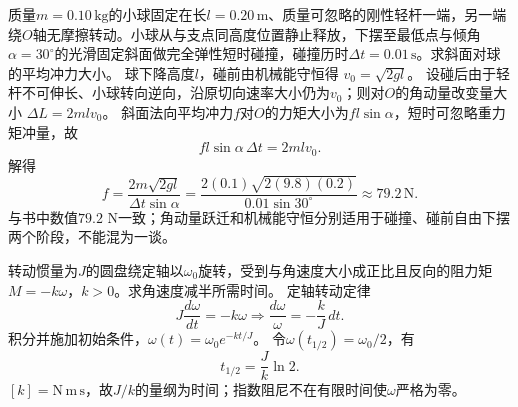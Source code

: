 \problemtext 质量$m=0.10\,\mathrm{kg}$的小球固定在长$l=0.20\,\mathrm m$、质量可忽略的刚性轻杆一端，另一端绕$O$轴无摩擦转动。小球从与支点同高度位置静止释放，下摆至最低点与倾角$\alpha=30^\circ$的光滑固定斜面做完全弹性短时碰撞，碰撞历时$\Delta t=0.01\,\mathrm s$。求斜面对球的平均冲力大小。
\workings
球下降高度$l$，碰前由机械能守恒得
$v_0=\sqrt{2gl}$。
设碰后由于轻杆不可伸长、小球转向逆向，沿原切向速率大小仍为$v_0$；则对$O$的角动量改变量大小
$\Delta L=2mlv_0$。
斜面法向平均冲力$f$对$O$的力矩大小为$fl\sin\alpha$，短时可忽略重力矩冲量，故
\[
fl\sin\alpha\,\Delta t=2mlv_0.
\]
解得
\[
\boxed{f=\frac{2m\sqrt{2gl}}{\Delta t\sin\alpha}
=\frac{2(0.1)\sqrt{2(9.8)(0.2)}}{0.01\sin30^\circ}
\approx79.2\,\mathrm N}.
\]
\crosscheck 与书中数值$79.2$ N一致；角动量跃迁和机械能守恒分别适用于碰撞、碰前自由下摆两个阶段，不能混为一谈。

\problemtext 转动惯量为$J$的圆盘绕定轴以$\omega_0$旋转，受到与角速度大小成正比且反向的阻力矩$M=-k\omega$，$k>0$。求角速度减半所需时间。
\workings
定轴转动定律
\[
J\frac{d\omega}{dt}=-k\omega
\Longrightarrow
\frac{d\omega}{\omega}=-\frac{k}{J}\,dt.
\]
积分并施加初始条件，$\omega(t)=\omega_0e^{-kt/J}$。
令$\omega(t_{1/2})=\omega_0/2$，有
\[
\boxed{t_{1/2}=\frac{J}{k}\ln2}.
\]
\crosscheck $[k]=\mathrm{N\,m\,s}$，故$J/k$的量纲为时间；指数阻尼不在有限时间使$\omega$严格为零。
